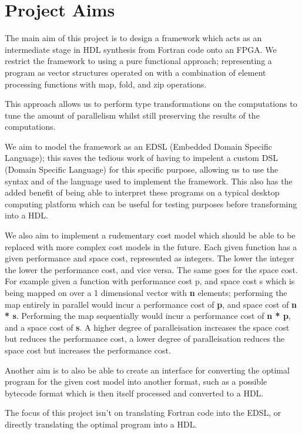 \section{Project Aims}
The main aim of this project is to design a framework which acts as an intermediate stage in HDL synthesis from Fortran code onto
an FPGA. We restrict the framework to using a pure functional approach; representing a program as vector structures operated
on with a combination of element processing functions with map, fold, and zip operations.

This approach allows us to perform type transformations on the computations to tune the amount of parallelism
whilst still preserving the results of the computations. 

We aim to model the framework as an EDSL (Embedded Domain Specific Language); this saves the tedious work
of having to impelent a custom DSL (Domain Specific Language) for this specific purpose, allowing us to use the 
syntax and of the language used to implement the framework. This also has the added benefit of being able to interpret 
these programs on a typical desktop computing platform which can be useful for testing purposes before transforming into a 
HDL. 

We also aim to implement a rudementary cost model which should be able to be replaced with more complex
cost models in the future. Each given function has a given performance and space cost, represented as integers. 
The lower the integer the lower the performance cost, and vice versa. The same goes for the space cost. 
For example given a function with performance cost p, and space cost s which is being mapped on over
a 1 dimensional vector with \textbf{n} elements; performing the map entirely in parallel would incur a performance
cost of \textbf{p}, and space cost of \textbf{n * s}. Performing the map sequentially would incur a performance cost of
\textbf{n * p}, and a space cost of \textbf{s}. A higher degree of paralleisation increases the space cost but reduces
the performance cost, a lower degree of paralleisation reduces the space cost but increases the 
performance cost.

Another aim is to also be able to create an interface for converting the optimal program for the given cost model 
into another format, such as a possible bytecode format which is then itself processed and converted to a HDL.

The focus of this project isn't on translating Fortran code into the EDSL, or directly translating the optimal program 
into a HDL.
